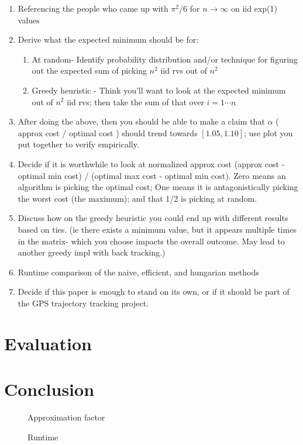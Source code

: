 \documentclass{article}
\begin{document}
\begin{enumerate}
	\item Referencing the people who came up with $\pi^2/6$ for $n \to \infty$ on iid exp(1) values
	\item Derive what the expected minimum should be for:
	\begin{enumerate}
		\item At random- Identify probability distribution and/or technique for figuring out the expected sum of picking $n^2$ iid rvs out of $n^2$
		\item Greedy heuristic - Think you'll want to look at the expected minimum out of $n^2$ iid rvs; then take the sum of that over $i = 1 \cdots n$
	\end{enumerate}
	\item After doing the above, then you should be able to make a claim that $\alpha$ ( approx cost / optimal cost ) should trend towards $[1.05, 1.10]$; use plot you put together to verify empirically. 
	\item Decide if it is worthwhile to look at normalized approx cost (approx cost - optimal min cost) / (optimal max cost - optimal min cost). Zero means an algorithm is picking the optimal cost; One means it is antagonistically picking the worst cost (the maximum); and that 1/2 is picking at random.
	\item Discuss how on the greedy heuristic you could end up with different results based on ties. (ie there exists a minimum value, but it appears multiple times in the matrix- which you choose impacts the overall outcome. May lead to another greedy impl with back tracking.)
	\item Runtime comparison of the naive, efficient, and hungarian methods

	\item Decide if this paper is enough to stand on its own, or if it should be part of the GPS trajectory tracking project.

\end{enumerate}

\section{Evaluation}

\section{Conclusion}

\begin{figure}
	\centering
	
	\caption{Approximation factor}
	\label{fig:approximationFactor}
\end{figure}

\begin{figure}
	\centering
	
	\caption{Runtime}
	\label{fig:runtime}
\end{figure}
\end{document}
